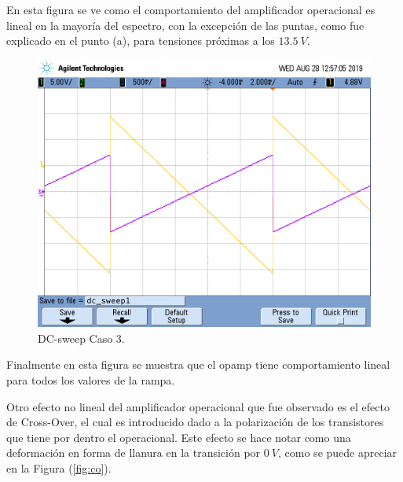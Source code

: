 En esta figura se ve como el comportamiento del amplificador operacional es lineal en la mayoría del espectro, con la excepción de las puntas, como fue explicado en el punto (a), para tensiones próximas a los $ 13.5 \ V$.
\begin{figure}[H]	
	\centering
	\includegraphics[width=\textwidth]{Ejercicio1/Imagenes/dc_sweep_c3.png}
	\caption{DC-sweep Caso 3.}
	\label{fig:dcc3}
\end{figure} 
Finalmente en esta figura se muestra que el opamp tiene comportamiento lineal para todos los valores de la rampa.

Otro efecto no lineal del amplificador operacional que fue observado es el efecto de Cross-Over, el cual es introducido dado a la polarización de los transistores que tiene por dentro el operacional. Este efecto se hace notar como una deformación en forma de llanura en la transición por $0 \ V$, como se puede apreciar en la Figura (\ref{fig:co}).

